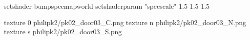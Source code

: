 setshader bumpspecmapworld
setshaderparam "specscale" 1.5 1.5 1.5

texture 0 philipk2/pk02_door03_C.png
texture n philipk2/pk02_door03_N.png
texture s philipk2/pk02_door03_S.png

